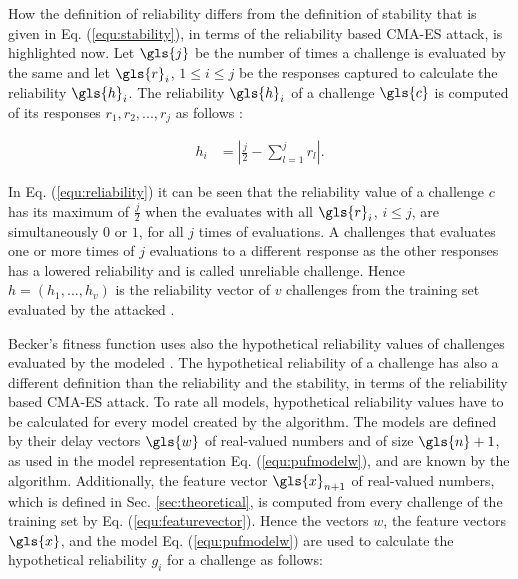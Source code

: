 How the definition of reliability differs from the definition of stability that is given in Eq. (\ref{equ:stability}), in terms of the reliability based \ac{CMA-ES} attack, is highlighted now.
Let $\gls{j}$ be the number of times a challenge is evaluated by the same \puf and let $\gls{r}_i$, $1 \le i \le j$ be the responses captured to calculate the reliability $\gls{h}_i$.
The reliability $\gls{h}_i$ of a challenge $\gls{c}$ is computed of its responses $r_1, r_2, ..., r_j$ as follows \cite{Becker2015ThePUFs}:

\begin{align}
h_i &= |\frac{j}{2} - \sum_{l = 1}^{j}r_l|. \label{equ:reliability}
\end{align}


In Eq. (\ref{equ:reliability}) it can be seen that the reliability value of a challenge $c$ has its maximum of $\frac{j}{2}$ when the \puf evaluates with all $\gls{r}_i$, $i \le j$, are simultaneously $0$ or $1$, for all $j$ times of evaluations. %
A challenges that evaluates one or more times of $j$ evaluations to a different response as the other responses has a lowered reliability and is called unreliable challenge.
Hence $h = (h_1, ..., h_v)$ is the reliability vector of $v$ challenges from the training set evaluated by the attacked \puf.

Becker's fitness function uses also the hypothetical reliability values of challenges evaluated by the modeled \pufs.
The hypothetical reliability of a challenge has also a different definition than the reliability and the stability, in terms of the reliability based \ac{CMA-ES} attack.
To rate all models, hypothetical reliability values have to be calculated for every model created by the algorithm.
The models are defined by their delay vectors $\gls{w}$ of real-valued numbers and of size $\gls{n} + 1$, as used in the \apuf model representation Eq. (\ref{equ:pufmodelw}), and are known by the algorithm. %
Additionally, the feature vector $\gls{x}_{n+1}$ of real-valued numbers, which is defined in Sec. \ref{sec:theoretical}, is computed from every challenge of the training set by Eq. (\ref{equ:featurevector}).
Hence the vectors $w$, the feature vectors $\gls{x}$, and the \apuf model Eq. (\ref{equ:pufmodelw}) are used to calculate the hypothetical reliability $g_i$ for a challenge as follows:

